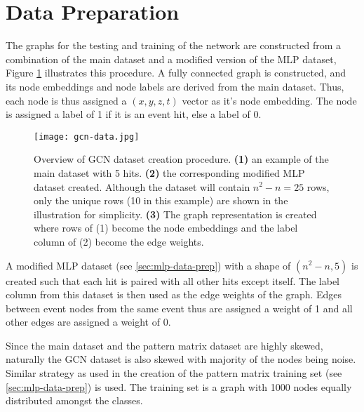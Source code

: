 \section{Data Preparation}
\label{sec:gcn-data-prep}

The graphs for the testing and training of the network are constructed
from a combination of the main dataset and a modified version of the
MLP dataset, Figure \ref{fig:gcn-data} illustrates this procedure. A
fully connected graph is constructed, and its node embeddings and node
labels are derived from the main dataset. Thus, each node is thus
assigned a $(x,y,z,t)$ vector as it's node embedding. The node is
assigned a label of 1 if it is an event hit, else a label of 0.

\begin{figure}[h]
  \centering
  \texttt{[image: gcn-data.jpg]}
  \caption{Overview of GCN dataset creation procedure. \textbf{(1)} an
    example of the main dataset with 5 hits. \textbf{(2)} the
    corresponding modified MLP dataset created. Although the dataset
    will contain $n^{2}-n = 25$ rows, only the unique rows (10 in this
    example) are shown in the illustration for simplicity.
    \textbf{(3)} The graph representation is created where rows of (1)
    become the node embeddings and the label column of (2) become the
    edge weights.}
  \label{fig:gcn-data}
\end{figure}

A modified MLP dataset (see \ref{sec:mlp-data-prep}) with a shape of
\texttt{$(n^{2}-n, 5)$} is created such that each hit is paired with
all other hits except itself. The label column from this dataset is
then used as the edge weights of the graph. Edges between event nodes
from the same event thus are assigned a weight of 1 and all other
edges are assigned a weight of 0.


Since the main dataset and the pattern matrix dataset are highly
skewed, naturally the GCN dataset is also skewed with majority of the
nodes being noise. Similar strategy as used in the creation of the
pattern matrix training set (see \ref{sec:mlp-data-prep}) is
used. The training set is a graph with 1000 nodes equally distributed
amongst the classes.

